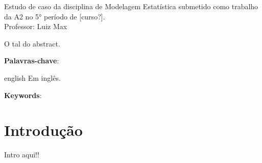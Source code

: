\documentclass[article,11pt,a4paper,brazil]{abntex2}
\begin{document}
	
	
	\frenchspacing 
	
	
	
	\maketitle
	\thispagestyle{empty}
	\begin{citacao}
		Estudo de caso da disciplina de Modelagem Estatística submetido como trabalho da A2 no 5° período de [curso?].\\
		Professor: Luiz Max
	\end{citacao}
	
	\newpage
	\thispagestyle{empty}
	\begin{resumoumacoluna}
		O tal do abstract. \lipsum[2]
		
		\vspace{\onelineskip}
		
		\noindent
		\textbf{Palavras-chave}: 
	\end{resumoumacoluna}
	
	\newpage	
	\thispagestyle{empty}
	\renewcommand{\resumoname}{Abstract}
	\begin{resumoumacoluna}
		\begin{otherlanguage*}{english}
			Em inglês. \lipsum[2]
			
			\vspace{\onelineskip}
			
			\noindent
			\textbf{Keywords}: 
		\end{otherlanguage*}  
	\end{resumoumacoluna}
	
	\newpage
	\thispagestyle{empty}
	\tableofcontents*
	\newpage
	
	\section{Introdução}
	\setcounter{page}{1}
	\pagestyle{plain}
	Intro aqui!!
	
\end{document}

